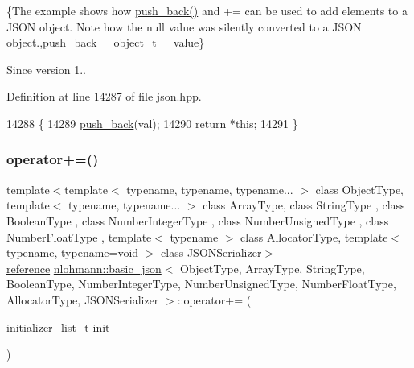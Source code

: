 \{The example shows how {\ttfamily \hyperlink{classnlohmann_1_1basic__json_ac8e523ddc8c2dd7e5d2daf0d49a9c0d7}{push\+\_\+back()}} and {\ttfamily +=} can be used to add elements to a J\+S\+ON object. Note how the {\ttfamily null} value was silently converted to a J\+S\+ON object.,push\+\_\+back\+\_\+\+\_\+object\+\_\+t\+\_\+\+\_\+value\}

\begin{DoxySince}{Since}
version 1.. 
\end{DoxySince}


Definition at line 14287 of file json.\+hpp.


\begin{DoxyCode}
14288     \{
14289         \hyperlink{classnlohmann_1_1basic__json_ac8e523ddc8c2dd7e5d2daf0d49a9c0d7}{push\_back}(val);
14290         \textcolor{keywordflow}{return} *\textcolor{keyword}{this};
14291     \}
\end{DoxyCode}
\mbox{\label{classnlohmann_1_1basic__json_af245c2b6714d76ed99a2d02f2596d596}} 
\subsubsection{\texorpdfstring{operator+=()}{operator+=()}\hspace{0.1cm}{\footnotesize\ttfamily [4/4]}}
{\footnotesize\ttfamily template$<$template$<$ typename, typename, typename... $>$ class Object\+Type, template$<$ typename, typename... $>$ class Array\+Type, class String\+Type , class Boolean\+Type , class Number\+Integer\+Type , class Number\+Unsigned\+Type , class Number\+Float\+Type , template$<$ typename $>$ class Allocator\+Type, template$<$ typename, typename=void $>$ class J\+S\+O\+N\+Serializer$>$ \\
\hyperlink{classnlohmann_1_1basic__json_ac6a5eddd156c776ac75ff54cfe54a5bc}{reference} \hyperlink{classnlohmann_1_1basic__json}{nlohmann\+::basic\+\_\+json}$<$ Object\+Type, Array\+Type, String\+Type, Boolean\+Type, Number\+Integer\+Type, Number\+Unsigned\+Type, Number\+Float\+Type, Allocator\+Type, J\+S\+O\+N\+Serializer $>$\+::operator+= (\begin{DoxyParamCaption}\item[{\hyperlink{classnlohmann_1_1basic__json_ad70a098fbc01c53497db29d3b5b656a9}{initializer\+\_\+list\+\_\+t}}]{init }\end{DoxyParamCaption})\hspace{0.3cm}{\ttfamily [inline]}}



